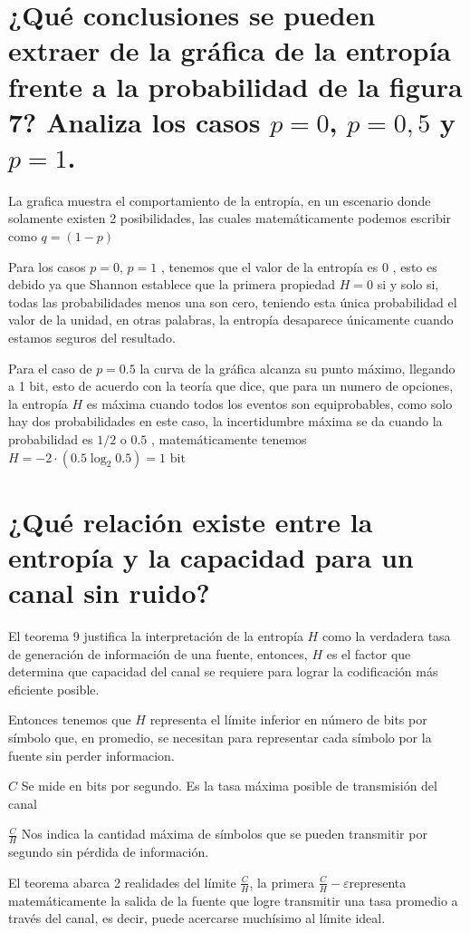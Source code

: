 \section{¿Qué conclusiones se pueden extraer de la gráfica de la entropía frente a la probabilidad de la figura 7? Analiza los casos $p=0$, $p=0,5$ y $p=1$.}
La grafica muestra el comportamiento de la entropía, en un escenario donde solamente existen 2 posibilidades, las cuales matemáticamente podemos escribir como $q = (1 - p)$

Para los casos $p = 0$, $p = 1$ , tenemos que el valor de la entropía es 0 , esto es debido ya que Shannon establece que la primera propiedad $H = 0$ si y solo si, todas las probabilidades menos una son cero, teniendo esta única probabilidad el valor de la unidad, en otras palabras, la entropía desaparece únicamente cuando estamos seguros del resultado.

Para el caso de $p = 0.5$ la curva de la gráfica alcanza su punto máximo, llegando a 1 bit, esto de acuerdo con la teoría que dice, que para un numero de opciones, la entropía $H$ es máxima cuando todos los eventos son equiprobables, como solo hay dos probabilidades en este caso, la incertidumbre máxima se da cuando la probabilidad es $1/2$ o $0.5$ , matemáticamente tenemos $H = -2 \cdot (0.5 \log_2 0.5) = 1 \text{ bit}$ 

\section{¿Qué relación existe entre la entropía y la capacidad para un canal sin ruido?}

El teorema 9 justifica la interpretación de la entropía $H$ como la verdadera tasa de generación de información de una fuente, entonces, $H$ es el factor que determina que capacidad del canal se requiere para lograr la codificación más eficiente posible.

Entonces tenemos que $H$ representa el límite inferior en número de bits por símbolo que, en promedio, se necesitan para representar cada símbolo por la fuente sin perder informacion.

$C$ Se mide en bits por segundo. Es la tasa máxima posible de transmisión del canal

$\frac{C}{H}$ Nos indica la cantidad máxima de símbolos que se pueden transmitir por segundo sin pérdida de información.

El teorema abarca 2 realidades del límite $\frac{C}{H}$, la primera $\frac{C}{H} - \varepsilon$representa matemáticamente la salida de la fuente que logre transmitir una tasa promedio a través del canal, es decir, puede acercarse muchísimo al límite ideal.

